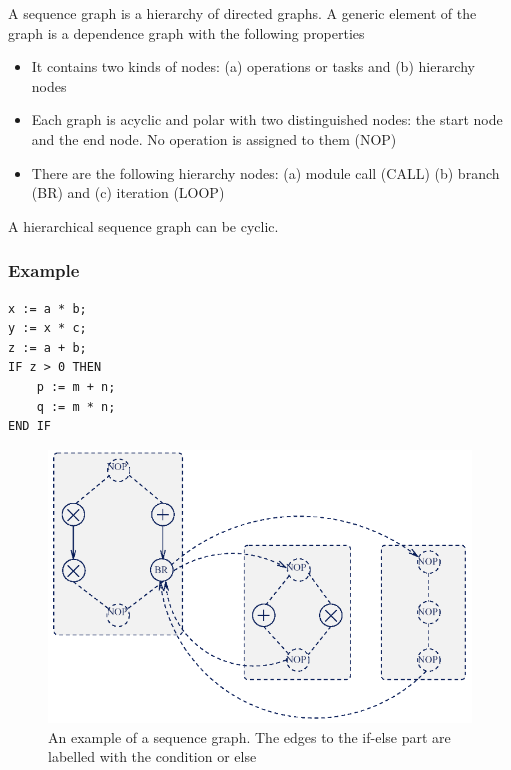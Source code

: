 A sequence graph is a hierarchy of directed graphs. A 
generic element of the graph is a dependence graph with the following properties

\begin{itemize}[noitemsep]
\item It contains two kinds of nodes: (a) operations or tasks
and (b) hierarchy nodes
\item Each graph is acyclic and polar with two distinguished nodes: the start node and the end node. No operation is assigned to them (NOP)
\item There are the following hierarchy nodes: (a) module call (CALL) (b) branch (BR) and (c) iteration (LOOP)
\end{itemize}

\begin{tnote}
A hierarchical sequence graph can be cyclic.
\end{tnote}

\subsubsection{Example}

\begin{lstlisting}[basicstyle=\small]
x := a * b;
y := x * c;
z := a + b;
IF z > 0 THEN
	p := m + n;
	q := m * n;
END IF
\end{lstlisting}


\begin{figure}[ht]
	\centering
  	\includegraphics[scale=0.4]{img/10_example_sequence_graph.png}
	\caption{An example of a sequence graph. The edges to the if-else part are labelled with the condition or else}
	\label{fig_sequence_graph}
\end{figure}




